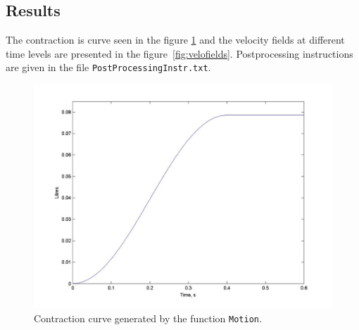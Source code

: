\subsection*{Results}

The contraction is curve seen in the figure \ref{fig:contra} and
the velocity fields at different time levels are presented
in the figure~\ref{fig:velofields}.  Postprocessing instructions
are given in the file {\tt PostProcessingInstr.txt}.

\begin{figure}[!hb]
\begin{center}
\includegraphics[width=15cm]{motion}
\caption{Contraction curve generated by the function {\tt Motion}.}
\label{fig:contra}
\end{center}
\end{figure}

